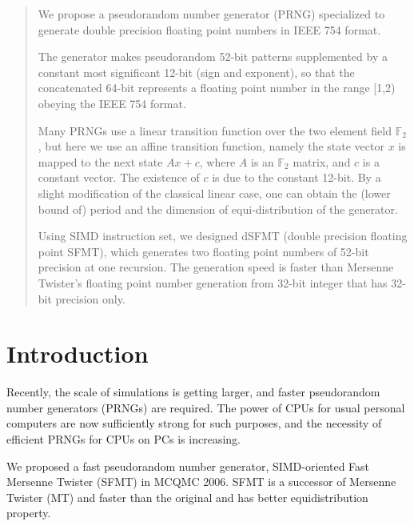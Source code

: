 \documentclass{svmult}
\begin{document}
\begin{abstract} 
  We propose a pseudorandom number generator (PRNG) specialized to
  generate double precision floating point numbers in IEEE 754 format.

  The generator makes pseudorandom 52-bit patterns supplemented
  by a constant most significant 12-bit (sign and exponent), so 
  that the concatenated 64-bit represents a floating
  point number in the range [1,2) obeying the IEEE 754 format.

  Many PRNGs use a linear transition function over the two element 
  field $\mathbb{F}_2$, but here we use an affine transition function,
  namely the state vector $x$ is mapped to the next state $Ax+c$,
  where $A$ is an $\mathbb{F}_2$ matrix, and $c$ is a constant vector. 
  The existence of $c$ is due to the constant 12-bit.
  By a slight modification of the classical linear case,
  one can obtain the (lower bound of) period and the dimension of
  equi-distribution of the generator.

  Using SIMD instruction set, we designed dSFMT (double precision floating
  point SFMT), which generates two floating point numbers of 52-bit precision
  at one recursion.
  The generation speed is faster than Mersenne Twister's
  floating point number generation from 32-bit integer
  that has 32-bit precision only.
\end{abstract}

\section {Introduction}
\label{sec:intro}

Recently, the scale of simulations is getting larger, and faster
pseudorandom number generators (PRNGs) are required. The power of CPUs
for usual personal computers are now sufficiently strong for such
purposes, and the necessity of efficient PRNGs for CPUs on PCs is
increasing.

We proposed a fast pseudorandom number generator, SIMD-oriented Fast
Mersenne Twister\cite{SFMT} (SFMT) in MCQMC 2006.  SFMT is a successor
of Mersenne Twister\cite{MT} (MT) and faster than the original and has
better equidistribution property.
\end{document}
